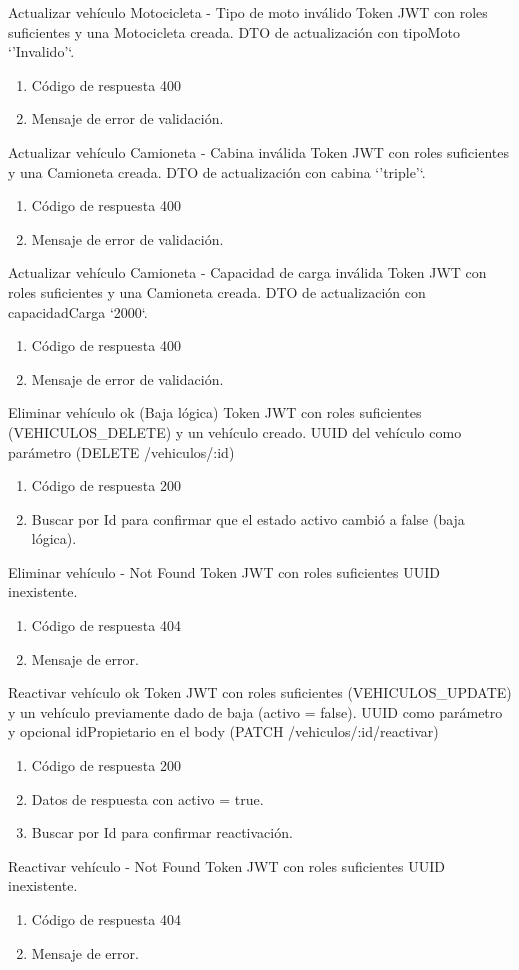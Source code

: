 {Actualizar vehículo Motocicleta - Tipo de moto inválido}
{Token JWT con roles suficientes y una Motocicleta creada.}
{DTO de actualización con tipoMoto `'Invalido'`.}
{\begin{enumerate} [leftmargin=*, nosep]
    \item Código de respuesta 400
    \item Mensaje de error de validación.
\end{enumerate}}

{Actualizar vehículo Camioneta - Cabina inválida}
{Token JWT con roles suficientes y una Camioneta creada.}
{DTO de actualización con cabina `'triple'`.}
{\begin{enumerate} [leftmargin=*, nosep]
    \item Código de respuesta 400
    \item Mensaje de error de validación.
\end{enumerate}}

{Actualizar vehículo Camioneta - Capacidad de carga inválida}
{Token JWT con roles suficientes y una Camioneta creada.}
{DTO de actualización con capacidadCarga `2000`.}
{\begin{enumerate} [leftmargin=*, nosep]
    \item Código de respuesta 400
    \item Mensaje de error de validación.
\end{enumerate}}

{Eliminar vehículo ok (Baja lógica)}
{Token JWT con roles suficientes (VEHICULOS\_DELETE) y un vehículo creado.}
{UUID del vehículo como parámetro (DELETE /vehiculos/:id)}
{\begin{enumerate} [leftmargin=*, nosep]
    \item Código de respuesta 200
    \item Buscar por Id para confirmar que el estado activo cambió a false (baja lógica).
\end{enumerate}}

{Eliminar vehículo - Not Found}
{Token JWT con roles suficientes}
{UUID inexistente.}
{\begin{enumerate} [leftmargin=*, nosep]
    \item Código de respuesta 404
    \item Mensaje de error.
\end{enumerate}}

{Reactivar vehículo ok}
{Token JWT con roles suficientes (VEHICULOS\_UPDATE) y un vehículo previamente dado de baja (activo = false).}
{UUID como parámetro y opcional idPropietario en el body (PATCH /vehiculos/:id/reactivar)}
{\begin{enumerate} [leftmargin=*, nosep]
    \item Código de respuesta 200
    \item Datos de respuesta con activo = true.
    \item Buscar por Id para confirmar reactivación.
\end{enumerate}}

{Reactivar vehículo - Not Found}
{Token JWT con roles suficientes}
{UUID inexistente.}
{\begin{enumerate} [leftmargin=*, nosep]
    \item Código de respuesta 404
    \item Mensaje de error.
\end{enumerate}}

